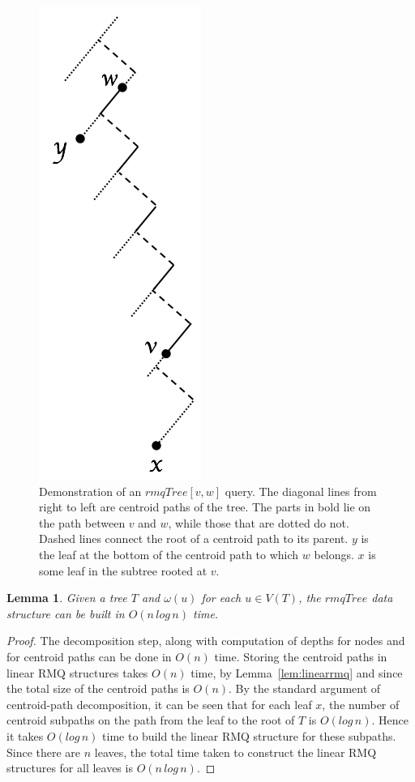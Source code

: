 \documentclass[final,1p,times]{elsarticle}
\newcommand{\weight}{\omega}
\newtheorem{lemma}[theorem]{Lemma}
\begin{document}
    \begin{figure}[ht]
        \includegraphics[scale=0.5]{rmq}
        \centering
        \caption[$rmqTree$ query]{Demonstration of an $rmqTree[v, w]$ query. The diagonal lines from right to left are centroid paths of the tree. The parts in bold lie on the path between $v$ and $w$, while those that are dotted do not. Dashed lines connect the root of a centroid path to its parent. $y$ is the leaf at the bottom of the centroid path to which $w$ belongs. $x$ is some leaf in the subtree rooted at $v$.}
        \label{fig:rmq}
    \end{figure}

    \begin{lemma}
        \label{lem:rmqdatastructure}
        Given a tree $T$ and $\weight(u)$ for each $u \in V(T)$, the $rmqTree$ data structure can be built in $O(n\,log\,n)$ time.
    \end{lemma}
        \begin{proof}
            The decomposition step, along with computation of depths for nodes and for centroid paths can be done in $O(n)$ time. Storing the centroid paths in linear RMQ structures takes $O(n)$ time, by Lemma~\ref{lem:linearrmq} and since the total size of the centroid paths is $O(n)$. By the standard argument of centroid-path decomposition, it can be seen that for each leaf $x$, the number of centroid subpaths on the path from the leaf to the root of $T$ is $O(log\,n)$. Hence it takes $O(log\,n)$ time to build the linear RMQ structure for these subpaths. Since there are $n$ leaves, the total time taken to construct the linear RMQ structures for all leaves is $O(n\,log\,n)$.
        \end{proof}
\end{document}
